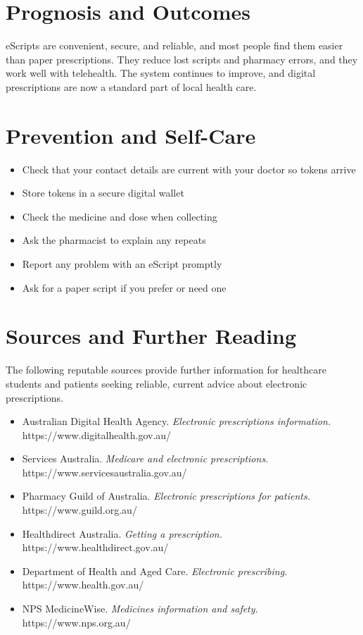 \section*{Prognosis and Outcomes}
eScripts are convenient, secure, and reliable, and most people find them easier than paper prescriptions. They reduce lost scripts and pharmacy errors, and they work well with telehealth. The system continues to improve, and digital prescriptions are now a standard part of local health care.

\section*{Prevention and Self-Care}
\begin{itemize}
    \item Check that your contact details are current with your doctor so tokens arrive
    \item Store tokens in a secure digital wallet
    \item Check the medicine and dose when collecting
    \item Ask the pharmacist to explain any repeats
    \item Report any problem with an eScript promptly
    \item Ask for a paper script if you prefer or need one
\end{itemize}

\section*{Sources and Further Reading}
The following reputable sources provide further information for healthcare students and patients seeking reliable, current advice about electronic prescriptions.
\begin{itemize}
    \item Australian Digital Health Agency. \textit{Electronic prescriptions information.} https://www.digitalhealth.gov.au/
    \item Services Australia. \textit{Medicare and electronic prescriptions.} https://www.servicesaustralia.gov.au/
    \item Pharmacy Guild of Australia. \textit{Electronic prescriptions for patients.} https://www.guild.org.au/
    \item Healthdirect Australia. \textit{Getting a prescription.} https://www.healthdirect.gov.au/
    \item Department of Health and Aged Care. \textit{Electronic prescribing.} https://www.health.gov.au/
    \item NPS MedicineWise. \textit{Medicines information and safety.} https://www.nps.org.au/
\end{itemize}
